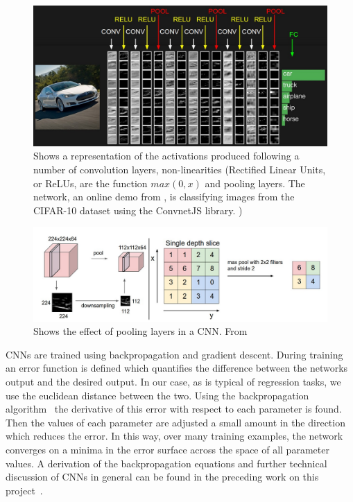 \documentclass[11pt]{article} %
\begin{document}
\begin{figure}
\includegraphics*[width=1\linewidth,clip]{convnet}
\caption{Shows a representation of the activations produced following a number of convolution layers, non-linearities (Rectified Linear Units, or ReLUs, are the function $max(0,x)$ and pooling layers. The network, an online demo from \cite{KarLects}, is classifying images from the CIFAR-10 dataset using the ConvnetJS library\protect\footnotemark. ) \label{fig:convnet}  }
\end{figure}

\begin{figure}
\includegraphics*[width=1\linewidth,clip]{pooling}
\caption{Shows the effect of pooling layers in a CNN.  From~\cite{KarLects} \label{fig:pool}  } 
\end{figure}

CNNs are trained using backpropagation and gradient descent. During training an error function is defined which quantifies the difference between the networks output and the desired output. In our case, as is typical of regression tasks, we use the euclidean distance between the two. Using the backpropagation algorithm~\cite{Rumelhart1986} the derivative of this error with respect to each parameter is found.  Then the values of each parameter are adjusted a small amount in the direction which reduces the error. In this way, over many training examples, the network converges on a minima in the error surface across the space of all parameter values.  A derivation of the backpropagation equations and further technical discussion of CNNs in general can be found in the preceding work on this project~\cite{Crabbe2015}.
\end{document}
